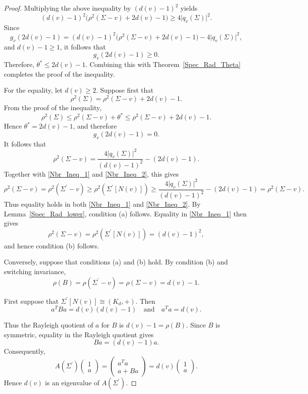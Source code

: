 \documentclass[12pt]{article}
\theoremstyle{plain}
\numberwithin{equation}{section}
\begin{document}
\begin{proof}
		Multiplying the above inequality by $(d(v)-1)^2$ yields
		\[
		(d(v)-1)^2\bigl(\rho^2(\Sigma-v)+2d(v)-1\bigr)
		\ge 4\vert q_v(\Sigma)\vert^2.
		\]
		Since
		\[
		g_v(2d(v)-1)
		=(d(v)-1)^2\bigl(\rho^2(\Sigma-v)+2d(v)-1\bigr)
		-4\vert q_v(\Sigma) \vert^2,
		\]
		and $d(v)-1\ge 1$, it follows that
		\[g_v(2d(v)-1)\ge 0.\]
		Therefore, $\theta^*\le 2d(v)-1$. Combining this with Theorem~\ref{Spec_Rad_Theta} completes the proof of the inequality. 
		
		For the equality, let $d(v) \geq 2$. Suppose first that
		\[ \rho^2(\Sigma)=\rho^2(\Sigma-v)+2d(v)-1. \]
		From the proof of the inequality,
		\[ \rho^2(\Sigma) \leq \rho^2(\Sigma-v)+\theta^* \leq \rho^2(\Sigma-v)+2d(v)-1. \]
		Hence $\theta^*=2d(v)-1$, and therefore
		\[ g_v(2d(v)-1)=0. \]
		It follows that
		\[ \rho^2(\Sigma-v) = \frac{4\vert q_v(\Sigma)\vert^2}{(d(v)-1)^2} -(2d(v)-1).\]
		Together with \eqref{Nbr_Ineq_1} and \eqref{Nbr_Ineq_2}, this gives
		\[ \rho^2(\Sigma-v) =\rho^2(\Sigma^\prime-v) \geq \rho^2(\Sigma^\prime[N(v)])
		\geq \frac{4\vert q_v(\Sigma)\vert^2}{(d(v)-1)^2} -(2d(v)-1) =\rho^2(\Sigma-v).\]
		Thus equality holds in both \eqref{Nbr_Ineq_1} and \eqref{Nbr_Ineq_2}. By Lemma~\ref{Spec_Rad_lower}, condition (a) follows. Equality in \eqref{Nbr_Ineq_1} then gives
		\[ \rho^2(\Sigma-v) =\rho^2(\Sigma^\prime[N(v)]) =(d(v)-1)^2, \]
		and hence condition (b) follows.
		
		Conversely, suppose that conditions (a) and (b) hold. By condition (b) and switching invariance,
		\[ \rho(B)=\rho(\Sigma^\prime-v)=\rho(\Sigma-v)=d(v)-1. \]
		
		First suppose that $\Sigma^\prime[N(v)]\cong(K_d,+)$. Then
		\[ a^TBa=d(v)(d(v)-1) \quad\text{and}\quad a^Ta=d(v). \]
		
		Thus the Rayleigh quotient of $a$ for $B$ is $d(v)-1=\rho(B)$. Since $B$ is symmetric, equality in the Rayleigh quotient gives
		\[ Ba=(d(v)-1)a. \]
		Consequently,
		\[ 
		A(\Sigma^\prime)
		\begin{pmatrix}
			1\\
			a
		\end{pmatrix}
		=
		\begin{pmatrix}
			a^Ta\\
			a+Ba
		\end{pmatrix}
		=d(v)
		\begin{pmatrix}
			1\\
			a
		\end{pmatrix}. \]
		Hence $d(v)$ is an eigenvalue of $A(\Sigma^\prime)$.
		

\end{proof}
\end{document}
